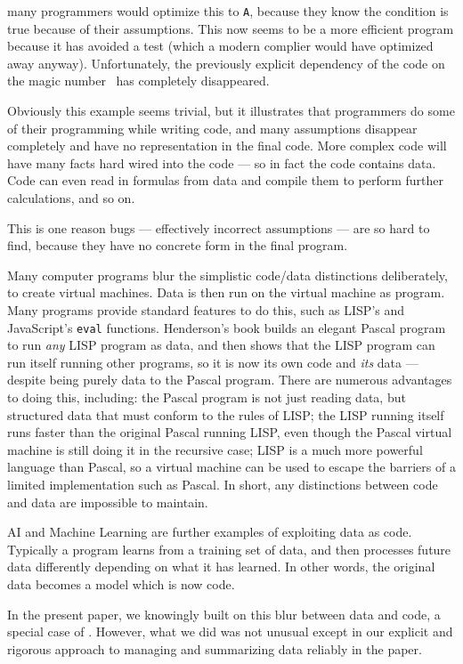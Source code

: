 \documentclass[10pt,a4paper]{article}
\begin{document}
many programmers would optimize this to \texttt{A}, because they know the condition is true because of their assumptions. This now seems to be a more efficient program because it has avoided a test (which a modern complier would have optimized away anyway). Unfortunately, the previously explicit dependency of the code on the magic number \the\magicNumber\ has completely disappeared.

Obviously this example seems trivial, but it illustrates that programmers do some of their programming while writing code, and many assumptions disappear completely and have no representation in the final code. More complex code will have many facts hard wired into the code --- so in fact the code contains data. Code can even read in formulas from data and compile them to perform further calculations, and so on.  

This is one reason bugs --- effectively incorrect assumptions --- are so hard to find, because they have no concrete form in the final program.

{Many computer programs blur the simplistic code/data distinctions deliberately, to create virtual machines. Data is then run on the virtual machine as program. Many programs provide standard features to do this, such as LISP's and JavaScript's \texttt{eval} functions. Henderson's book \cite{henderson} builds an elegant Pascal program to run \emph{any\/} LISP program as data, and then shows that the LISP program can run itself running other programs, so it is now its own code and \emph{its\/} data --- despite being purely data to the Pascal program. There are numerous advantages to doing this, including: the Pascal program is not just reading data, but structured data that must conform to the rules of LISP; the LISP running itself runs faster than the original Pascal running LISP, even though the Pascal virtual machine is still doing it in the recursive case; LISP is a much more powerful language than Pascal, so a virtual machine can be used to escape the barriers of a limited implementation such as Pascal. In short, any distinctions between code and data are impossible to maintain.}

AI and Machine Learning are further examples of exploiting data as code. Typically a program learns from a training set of data, and then processes future data differently depending on what it has learned. In other words, the original data becomes a model which is now code.

In the present paper, we knowingly built on this blur between data and code, a special case of \RAPstarp. However, what we did was not unusual except in our explicit and rigorous approach to managing and summarizing data reliably in the paper.
\end{document}
